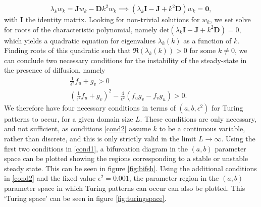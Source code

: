 $$
\lambda_k w_k=\textbf{J}w_k-\textbf{D}k^2w_k \implies (\lambda_k \textbf{I}-\textbf{J}+k^2\textbf{D})w_k=\textbf{0},
$$
with $\textbf{I}$ the identity matrix. Looking for non-trivial solutions for $w_k$, we set solve for roots of the characteristic polynomial, namely $\text{det}(\lambda_k \textbf{I}-\textbf{J}+k^2\textbf{D})=0$, which yields a quadratic equation for eigenvalues $\lambda_k(k)$ as a function of $k$. Finding roots of this quadratic such that $\Re(\lambda_k(k))>0$ for some $k\neq0$, we can conclude two necessary conditions for the instability of the steady-state in the presence of diffusion, namely
\begin{equation}\label{cond2}
    \begin{split}
    \frac{1}{\epsilon^2}f_u+g_v>0&\\
    \left(\frac{1}{\epsilon^2}f_u+g_v\right)^2-\frac{4}{\epsilon^2}(f_ug_v-f_vg_u)>0.
\end{split}
\end{equation}
We therefore have four necessary conditions in terms of $(a,b,\epsilon^2)$ for Turing patterns to occur, for a given domain size $L$. These conditions are only necessary, and not sufficient, as conditions \eqref{cond2} assume $k$ to be a continuous variable, rather than discrete, and this is only strictly valid in the limit $L\to\infty$. Using the first two conditions in \eqref{cond1}, a bifurcation diagram in the $(a,b)$ parameter space can be plotted showing the regions corresponding to a stable or unstable steady state. This can be seen in figure \ref{fig:bifsh}. Using the additional conditions in \eqref{cond2} and the fixed value $\epsilon^2=0.001$, the parameter region in the $(a,b)$ parameter space in which Turing patterns can occur can also be plotted. This `Turing space' can be seen in figure \ref{fig:turingspace}.

